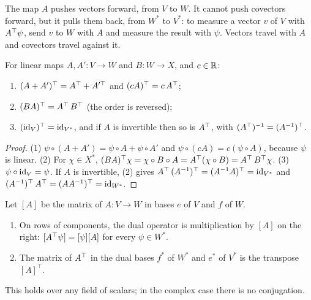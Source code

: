 \begin{notechapter}
\begin{intuition}
The map $A$ pushes vectors forward, from $V$ to $W$. It cannot push
covectors forward, but it pulls them back, from $W^*$ to $V^*$: to measure
a vector $v$ of $V$ with $A^{\top}\psi$, send $v$ to $W$ with $A$ and
measure the result with $\psi$. Vectors travel with $A$ and covectors
travel against it.
\end{intuition}

\begin{proposition}\label{duality:prop:rules}
For linear maps $A, A':V\to W$ and $B:W\to X$, and $c\in\mathbb{R}$:
\begin{enumerate}[nosep]
  \item $(A + A')^{\top} = A^{\top} + A'^{\top}$ and
        $(cA)^{\top} = c\,A^{\top}$;
  \item $(BA)^{\top} = A^{\top}\,B^{\top}$ (the order is reversed);
  \item $(\mathrm{id}_V)^{\top} = \mathrm{id}_{V^*}$, and if $A$ is invertible then so is
        $A^{\top}$, with $(A^{\top})^{-1} = (A^{-1})^{\top}$.
\end{enumerate}
\end{proposition}

\begin{proof}
(1) $\psi\circ(A + A') = \psi\circ A + \psi\circ A'$ and
$\psi\circ(cA) = c(\psi\circ A)$, because $\psi$ is linear.
(2) For $\chi\in X^*$, $(BA)^{\top}\chi = \chi\circ B\circ A
= A^{\top}(\chi\circ B) = A^{\top}\,B^{\top}\chi$.
(3) $\psi\circ\mathrm{id}_V = \psi$. If $A$ is invertible, (2) gives
$A^{\top}\,(A^{-1})^{\top} = (A^{-1}A)^{\top} = \mathrm{id}_{V^*}$ and
$(A^{-1})^{\top}\,A^{\top} = (AA^{-1})^{\top} = \mathrm{id}_{W^*}$.
\end{proof}

\begin{theorem}
\label{duality:thm:transpose}
Let $[A]$ be the matrix of $A:V\to W$ in bases $e$ of $V$ and $f$ of $W$.
\begin{enumerate}[nosep]
  \item On rows of components, the dual operator is multiplication by
        $[A]$ on the right:
        $[A^{\top}\psi] = [\psi][A]$ for every $\psi\in W^*$.
  \item The matrix of $A^{\top}$ in the dual bases $f^*$ of $W^*$ and
        $e^*$ of $V^*$ is the transpose $[A]^\top$.
\end{enumerate}
This holds over any field of scalars; in the complex case there is no
conjugation.
\end{theorem}


\end{notechapter}
